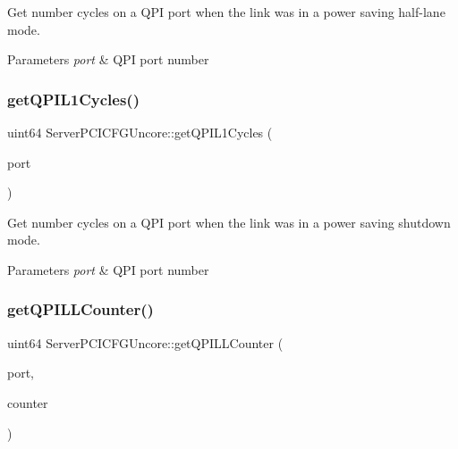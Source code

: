 Get number cycles on a Q\+PI port when the link was in a power saving half-\/lane mode. 


\begin{DoxyParams}{Parameters}
{\em port} & Q\+PI port number \\
\hline
\end{DoxyParams}
\mbox{\label{class_server_p_c_i_c_f_g_uncore_aa0ac63963af6105dd066f09beb923d17}} 
\subsubsection{\texorpdfstring{get\+Q\+P\+I\+L1\+Cycles()}{getQPIL1Cycles()}}
{\footnotesize\ttfamily uint64 Server\+P\+C\+I\+C\+F\+G\+Uncore\+::get\+Q\+P\+I\+L1\+Cycles (\begin{DoxyParamCaption}\item[{uint32}]{port }\end{DoxyParamCaption})}



Get number cycles on a Q\+PI port when the link was in a power saving shutdown mode. 


\begin{DoxyParams}{Parameters}
{\em port} & Q\+PI port number \\
\hline
\end{DoxyParams}
\mbox{\label{class_server_p_c_i_c_f_g_uncore_abcd9990a39fb245bb552e6cae4922305}} 
\subsubsection{\texorpdfstring{get\+Q\+P\+I\+L\+L\+Counter()}{getQPILLCounter()}}
{\footnotesize\ttfamily uint64 Server\+P\+C\+I\+C\+F\+G\+Uncore\+::get\+Q\+P\+I\+L\+L\+Counter (\begin{DoxyParamCaption}\item[{uint32}]{port,  }\item[{uint32}]{counter }\end{DoxyParamCaption})}



